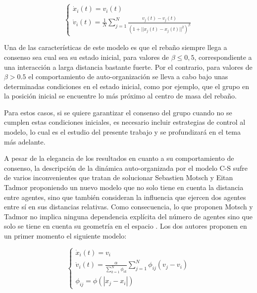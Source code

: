  \begin{equation}
    \left\lbrace
    \begin{array}{ll}
        \dot{x}_{i}(t)=v_{i}(t) \\
        \dot{v}_{i}(t)= \displaystyle{\frac{1}{N}\sum_{j=1}^{N}\frac{v_{j}(t)-v_{j}(t)}{(1+||x_{j}(t)-x_{j}(t)||^2)^\beta}}
    \end{array}
    \right.
\end{equation}
 
Una de las características de este modelo es que el rebaño siempre llega a consenso sea cual sea su estado inicial, para valores de $\beta \leq 0,5$, correspondiente a una interacción a larga distancia bastante fuerte. Por el contrario, para valores de $\beta >0.5$ el comportamiento de auto-organización se lleva a cabo bajo unas determinadas condiciones en el estado inicial, como por ejemplo, que el grupo en la posición inicial se encuentre lo más próximo al centro de masa del rebaño.

Para estos casos, si se quiere garantizar el consenso del grupo cuando no se cumplen estas condiciones iniciales, es necesario incluir estrategias de control al modelo, lo cual es el estudio del presente trabajo y se profundizará en el tema más adelante. 

A pesar de la elegancia de los resultados en cuanto a su comportamiento de consenso, la descripción de la dinámica auto-organizada por el modelo C-S sufre de varios inconvenientes que tratan de solucionar Sebastien Motsch y Eitan Tadmor proponiendo un nuevo modelo que no solo tiene en cuenta la distancia entre agentes, sino que también consideran la influencia que ejercen dos agentes entre sí en sus distancias relativas. Como consecuencia, lo que proponen Motsch y Tadmor no implica ninguna dependencia explícita del número de agentes sino que solo se tiene en cuenta su geometría en el espacio \cite{motsch2011new}. Los dos autores proponen en un primer momento el siguiente modelo: 

\begin{equation}
    \label{eq:MTmodel1}
    \left\lbrace
    \begin{array}{lll}
        \dot{x}_{i}(t)= v_{i} \\
        \dot{v}_{i}(t)=\displaystyle{\frac{\alpha}{\sum_{k=1}^{N}\phi_{ik}}\sum_{j=1}^{N}\phi_{ij}(v_{j}-v_{i})} \\ 
        \phi_{ij}=\phi(|x_{j}-x_{i}|)
    \end{array}
    \right.
\end{equation}

